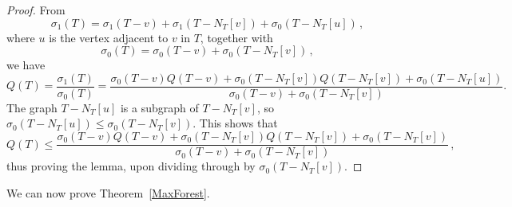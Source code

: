 \documentclass[a4paper,12pt]{amsart}
\begin{document}
	\begin{proof}
		From 
        $$\sigma_1(T)=\sigma_1\left(T-v\right)+\sigma_1\left(T-N_T[v]\right)+\sigma_0\left(T-N_T[u]\right)\,,$$
		where $u$ is the vertex adjacent to $v$ in $T$, together with
		$$\sigma_0(T)=\sigma_0\left(T-v\right)+\sigma_0\left(T-N_T[v]\right)\,,$$ we have
		\begin{equation*}
			Q(T)=\frac{\sigma_1(T)}{\sigma_0(T)}=\frac{\sigma_0(T-v)Q(T-v)+\sigma_0\left(T-N_T[v]\right)Q\left(T-N_T[v]\right)+\sigma_0\left(T-N_T[u]\right)}{\sigma_0(T-v)+\sigma_0\left(T-N_T[v]\right)}.
		\end{equation*}
		The graph $T-N_T[u]$ is a subgraph of $T-N_T[v]$, so $\sigma_0\left(T-N_T[u]\right)\leq \sigma_0\left(T-N_T[v]\right)$. This shows that
        \begin{equation*}
			Q(T) \leq \frac{\sigma_0(T-v)Q(T-v)+\sigma_0\left(T-N_T[v]\right)Q\left(T-N_T[v]\right)+\sigma_0\left(T-N_T[v]\right)}{\sigma_0(T-v)+\sigma_0\left(T-N_T[v]\right)}\,,
		\end{equation*}
        thus proving the lemma, upon dividing through by $\sigma_0\left(T-N_T[v]\right)$.	
	\end{proof}

    \medskip
    We can now prove Theorem~\ref{MaxForest}.
    
\end{document}
